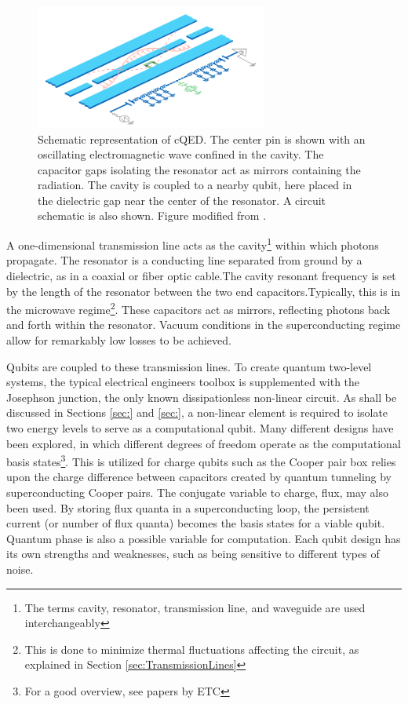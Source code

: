 \documentclass[12 pt]{book}
\begin{document}
\begin{figure}[h] 
   \centering
   \includegraphics[width=3in]{SchustercQEDSchematic.png} 
   \caption{Schematic representation of cQED. The center pin is shown with an oscillating electromagnetic wave confined in the cavity. The capacitor gaps isolating the resonator act as mirrors containing the radiation. The cavity is coupled to a nearby qubit, here placed in the dielectric gap near the center of the resonator. A circuit schematic is also shown. Figure modified from \cite{Schuster}.}
   \label{fig:cQEDSchematic}
\end{figure}

A one-dimensional transmission line acts as the cavity\footnote{The terms cavity, resonator, transmission line, and waveguide are used interchangeably} within which photons propagate. The resonator is a conducting line separated from ground by a dielectric, as in a coaxial or fiber optic cable.The cavity resonant frequency is set by the length of the resonator between the two end capacitors.Typically, this is in the microwave regime\footnote{This is done to minimize thermal fluctuations affecting the circuit, as explained in Section \ref{sec:TransmissionLines}}. These capacitors act as mirrors, reflecting photons back and forth within the resonator. Vacuum conditions in the superconducting regime allow for remarkably low losses to be achieved.

Qubits are coupled to these transmission lines. To create quantum two-level systems, the typical electrical engineers toolbox is supplemented with the Josephson junction, the only known dissipationless non-linear circuit\cite{Devoret2004}. As shall be discussed in Sections \ref{sec:} and \ref{sec:}, a non-linear element is required to isolate two energy levels to serve as a computational qubit. Many different designs have been explored, in which different degrees of freedom operate as the computational basis states\footnote{For a good overview, see papers by ETC}. This is utilized for charge qubits such as the Cooper pair box\cite{Nakamura1999} relies upon the charge difference between capacitors created by quantum tunneling by superconducting Cooper pairs. The conjugate variable to charge, flux, may also been used. By storing flux quanta in a superconducting loop, the persistent current (or number of flux quanta) becomes the basis states for a viable qubit. Quantum phase is also a possible variable for computation. Each qubit design has its own strengths and weaknesses, such as being sensitive to different types of noise. %
\end{document}

